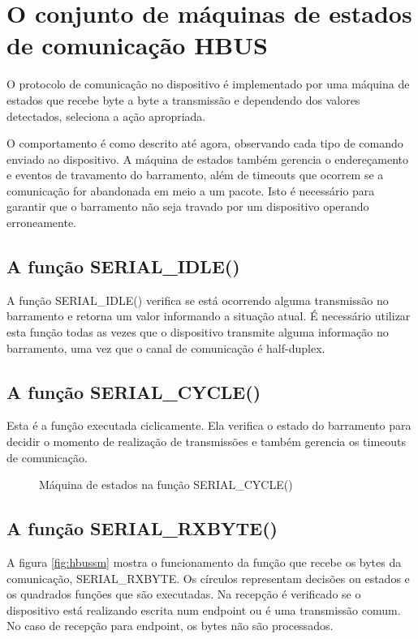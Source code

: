 \documentclass[11pt]{report}
\begin{document}
\section{O conjunto de  máquinas de estados de comunicação HBUS}

O protocolo de comunicação no dispositivo é implementado por uma máquina de estados que recebe byte a byte a transmissão e dependendo dos valores detectados, seleciona a ação apropriada.

O comportamento é como descrito até agora, observando cada tipo de comando enviado ao dispositivo. A máquina de estados também gerencia o endereçamento e eventos de travamento do barramento, além de timeouts que ocorrem se a comunicação for abandonada em meio a um pacote. Isto é necessário para garantir que o barramento não seja travado por um dispositivo operando erroneamente.

\subsection{A função SERIAL\_IDLE()}

A função SERIAL\_IDLE() verifica se está ocorrendo alguma transmissão no barramento e retorna um valor informando a situação atual. É necessário utilizar esta função todas as vezes que o dispositivo transmite alguma informação no barramento, uma vez que o canal de comunicação é half-duplex.

\subsection{A função SERIAL\_CYCLE()}

Esta é a função executada ciclicamente. Ela verifica o estado do barramento para decidir o momento de realização de transmissões e também gerencia os timeouts de comunicação.

\begin{figure}[H]
\centering

\caption{Máquina de estados na função SERIAL\_CYCLE()}
\end{figure}

\subsection{A função SERIAL\_RXBYTE()}

A figura \ref{fig:hbussm} mostra o funcionamento da função que recebe os bytes da comunicação, SERIAL\_RXBYTE. Os círculos representam decisões ou estados e os quadrados funções que são executadas. Na recepção é verificado se o dispositivo está realizando escrita num endpoint ou é uma transmissão comum. No caso de recepção para endpoint, os bytes não são processados.
\end{document}
